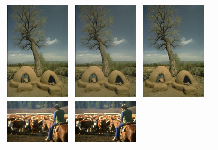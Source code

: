 \documentclass[10pt,twocolumn,letterpaper]{article}
\begin{document}
\begin{figure}[h!]
\begin{tabular}{cccc}
     	\includegraphics[width=1.5in]{images/used/appendix/jpg/BSD100/54082_SRResNet-MSE} &
     	\includegraphics[width=1.5in]{images/used/appendix/jpg/BSD100/54082_SRGAN-VGG54} &
     	\includegraphics[width=1.5in]{images/used/appendix/jpg/BSD100/54082_HR} \\     	
     	\includegraphics[width=1.5in]{images/used/appendix/jpg/BSD100/220075_bicubic}&
     	\includegraphics[width=1.5in]{images/used/appendix/jpg/BSD100/220075_SRResNet-MSE} &

\end{tabular}
\end{figure}
\end{document}
